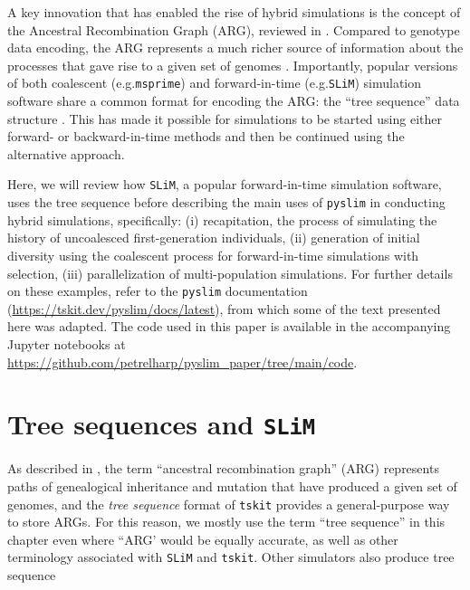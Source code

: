 \documentclass[12pt]{article}
\newcommand{\msprime}[0]{\texttt{msprime}\xspace}
\newcommand{\tskit}[0]{\texttt{tskit}\xspace}
\newcommand{\slim}[0]{\texttt{SLiM}\xspace}
\newcommand{\pyslim}[0]{\texttt{pyslim}\xspace}
\newcommand*{\eg}{e.g.\xcomma}
\begin{document}

A key innovation that has enabled the rise of hybrid simulations is the concept of the Ancestral Recombination Graph (ARG), reviewed in \citet{wong_general_2024}.
Compared to genotype data encoding, the ARG represents a much richer source of information about the processes that gave rise to a given set of genomes \citep{kelleher_efficient_2016}.
Importantly, popular versions of both coalescent (\eg \msprime) and forward-in-time (\eg \slim) simulation software share a common format for
encoding the ARG: the ``tree sequence'' data structure \citep{baumdicker_efficient_2022, haller_tree-sequence_2019}.
This has made it possible for simulations to be started using either forward- or backward-in-time
methods and then be continued using the alternative approach.

Here, we will review how \slim, a popular forward-in-time simulation software, uses the tree sequence before describing
the main uses of \pyslim in conducting hybrid simulations, specifically:
(i) recapitation, the process of simulating the history of uncoalesced first-generation individuals,
(ii) generation of initial diversity using the coalescent process for forward-in-time simulations with selection,
(iii) parallelization of multi-population simulations.
For further details on these examples, refer to the \pyslim{} documentation (\url{https://tskit.dev/pyslim/docs/latest}), from which some of the text presented here was adapted.
The code used in this paper is available in the accompanying Jupyter notebooks at \url{https://github.com/petrelharp/pyslim_paper/tree/main/code}.

\section{Tree sequences and \slim}
As described in \citet{wong_general_2024}, the term ``ancestral recombination graph'' (ARG)
represents paths of genealogical inheritance and mutation that have produced a given set of genomes,
and the \emph{tree sequence} format of \tskit provides a general-purpose way to store ARGs.
For this reason, we mostly use the term ``tree sequence'' in this chapter even where ``ARG'
would be equally accurate, as well as other terminology associated with \slim and \tskit \citep{kelleher_efficient_2016,ralph_efficiently_2020,wong_general_2024}.
Other simulators also produce tree sequence
\end{document}
